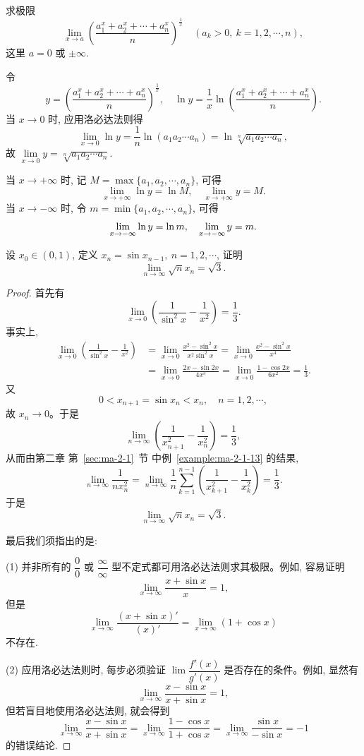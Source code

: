 \begin{example}\label{example:ma-5-2-8}
求极限
\[
  \lim_{x\to a}\left(\frac{a_1^x+a_2^x+\cdots+a_n^x}{n}\right)^{\frac1x}
  \quad (a_k>0,\ k=1,2,\cdots,n),
\]
这里 $a=0$ 或 $\pm\infty$.
\end{example}


\begin{solve}
令
\[
  y=\left(\frac{a_1^x+a_2^x+\cdots+a_n^x}{n}\right)^{\frac1x},
  \quad
  \ln y=\frac1x\ln\left(\frac{a_1^x+a_2^x+\cdots+a_n^x}{n}\right).
\]
当 $x\to0$ 时, 应用洛必达法则得
\[
  \lim_{x\to0}\ln y
  =
  \frac1n\ln(a_1a_2\cdots a_n)
  =
  \ln\sqrt[n]{a_1a_2\cdots a_n},
\]
故 $\lim\limits_{x\to0}y=\sqrt[n]{a_1a_2\cdots a_n}$.

当 $x\to+\infty$ 时, 记 $M=\max\{a_1,a_2,\cdots,a_n\}$, 可得
\[
  \lim_{x\to+\infty}\ln y=\ln M,\quad
  \lim_{x\to+\infty}y=M.
\]
当 $x\to-\infty$ 时, 令 $m=\min\{a_1,a_2,\cdots,a_n\}$, 可得
\[
  \lim_{x\to-\infty}\ln y=\ln m,\quad
  \lim_{x\to-\infty}y=m.
\qedhere
\]
\end{solve}


\begin{example}\label{example:ma-5-2-9}
设 $x_0\in(0,1)$, 定义 $x_n=\sin x_{n-1},\ n=1,2,\cdots$, 证明
\[
  \lim_{n\to\infty}\sqrt{n}x_n=\sqrt3.
\]
\end{example}


\begin{proof}
首先有
\[
  \lim_{x\to0}\left(\frac1{\sin^2x}-\frac1{x^2}\right)=\frac13.
\]
事实上,
\[
\begin{aligned}
  \lim_{x\to0}\left(\frac1{\sin^2x}-\frac1{x^2}\right)
  &=
  \lim_{x\to0}\frac{x^2-\sin^2x}{x^2\sin^2x}
  =
  \lim_{x\to0}\frac{x^2-\sin^2x}{x^4} \\
  &=
  \lim_{x\to0}\frac{2x-\sin2x}{4x^3}
  =
  \lim_{x\to0}\frac{1-\cos2x}{6x^2}
  =
  \frac13.
\end{aligned}
\]
又
\[
  0<x_{n+1}=\sin x_n<x_n,\quad n=1,2,\cdots,
\]
故 $x_n\to0$。于是
\[
  \lim_{n\to\infty}\left(\frac1{x_{n+1}^2}-\frac1{x_n^2}\right)=\frac13,
\]
从而由第二章 第~\ref{sec:ma-2-1}~节 中例~\ref{example:ma-2-1-13} 的结果,
\[
  \lim_{n\to\infty}\frac1{nx_n^2}
  =
  \lim_{n\to\infty}\frac1n\sum_{k=1}^{n-1}
  \left(\frac1{x_{k+1}^2}-\frac1{x_k^2}\right)
  =
  \frac13.
\]
于是
\[
  \lim_{n\to\infty}\sqrt{n}x_n=\sqrt3.
\]

最后我们须指出的是:

(1) 并非所有的 $\dfrac00$ 或 $\dfrac\infty\infty$ 型不定式都可用洛必达法则求其极限。例如, 容易证明
\[
  \lim_{x\to\infty}\frac{x+\sin x}{x}=1,
\]
但是
\[
  \lim_{x\to\infty}\frac{(x+\sin x)'}{(x)'}
  =
  \lim_{x\to\infty}(1+\cos x)
\]
不存在.

(2) 应用洛必达法则时, 每步必须验证 $\lim\dfrac{f'(x)}{g'(x)}$ 是否存在的条件。例如, 显然有
\[
  \lim_{x\to\infty}\frac{x-\sin x}{x+\sin x}=1,
\]
但若盲目地使用洛必达法则, 就会得到
\[
  \lim_{x\to\infty}\frac{x-\sin x}{x+\sin x}
  =
  \lim_{x\to\infty}\frac{1-\cos x}{1+\cos x}
  =
  \lim_{x\to\infty}\frac{\sin x}{-\sin x}
  =
  -1
\]
的错误结论.
\end{proof}


